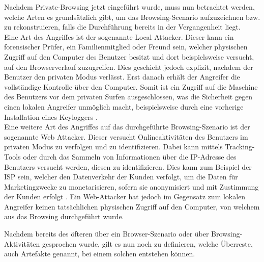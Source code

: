 Nachdem Private-Browsing jetzt eingeführt wurde, muss nun betrachtet werden, welche Arten es grundsätzlich gibt, um das Browsing-Scenario aufzuzeichnen bzw. zu rekonstruieren, falls die Durchführung bereits in der Vergangenheit liegt.\\
Eine Art des Angriffes ist der sogenannte \glqq{}Local Attacker\grqq{}. Dieser kann ein forensischer Prüfer, ein Familienmitglied oder Freund sein, welcher physischen Zugriff auf den Computer des Benutzer besitzt und dort beispielsweise versucht, auf den Browserverlauf zuzugreifen. Dies geschieht jedoch explizit, nachdem der Benutzer den privaten Modus verlässt. Erst danach erhält der Angreifer die vollständige Kontrolle über den Computer. Somit ist ein Zugriff auf die Maschine des Benutzers vor dem privaten Surfen ausgeschlossen, was die Sicherheit gegen einen lokalen Angreifer unmöglich macht, beispielsweise durch eine vorherige Installation eines Keyloggers \cite{Aggarwal.2010}.\\
Eine weitere Art des Angriffes auf das durchgeführte Browsing-Szenario ist der sogenannte \glqq{}Web Attacker\grqq{}. Dieser versucht Onlineaktivitäten des Benutzers im privaten Modus zu verfolgen und zu identifizieren. Dabei kann mittels Tracking-Tools oder durch das Sammeln von Informationen über die IP-Adresse des Benutzers versucht werden, diesen zu identifizieren. Dies kann zum Beispiel der ISP sein, welcher den Datenverkehr der Kunden verfolgt, um die Daten für Marketingzwecke zu monetarisieren, sofern sie anonymisiert und mit Zustimmung der Kunden erfolgt \cite{Aggarwal.2010}. Ein Web-Attacker hat jedoch im Gegensatz zum lokalen Angreifer keinen tatsächlichen physischen Zugriff auf den Computer, von welchem aus das Browsing durchgeführt wurde.

Nachdem bereits des öfteren über ein Browser-Szenario oder über Browsing-Aktivitäten gesprochen wurde, gilt es nun noch zu definieren, welche Überreste, auch Artefakte genannt, bei einem solchen entstehen können.

